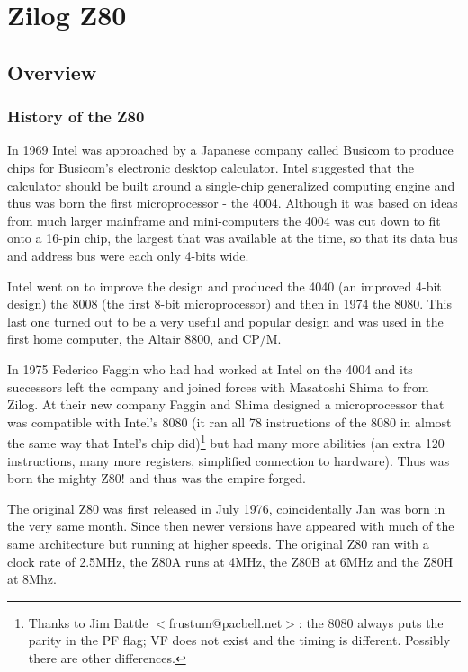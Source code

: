 \documentclass[12pt,twoside,openright,a4paper]{book}
\begin{document}
\chapter{Zilog Z80}

\minitoc

\pagebreak
\section{Overview}
\subsection{History of the Z80}

In 1969 Intel was approached by a Japanese company called Busicom to produce  chips for Busicom's electronic desktop calculator. Intel suggested that the calculator should be built around a single-chip generalized computing engine and thus was born the first microprocessor - the 4004. Although it was based on ideas from much larger mainframe and mini-computers the 4004 was cut down to fit onto a 16-pin chip, the largest that was available at the time, so that its data bus and address bus were each only 4-bits wide. 

Intel went on to improve the design and produced the 4040 (an improved 4-bit design) the 8008 (the first 8-bit microprocessor) and then in 1974 the 8080. This last one turned out to be a very useful and popular design and was used in the first home computer, the Altair 8800, and CP/M. 

In 1975 Federico Faggin who had had worked at Intel on the 4004 and its successors left the company and joined forces with Masatoshi Shima to from Zilog. At their new company Faggin and Shima designed a microprocessor that was compatible with Intel's 8080 (it ran all 78 instructions of the 8080 in almost the same way that Intel's chip did)\footnote{Thanks to Jim Battle $<$frustum@pacbell.net$>$: the 8080 always puts the parity in the PF flag; VF does not exist and the timing is different. Possibly there are other differences.} but had many more abilities (an extra 120 instructions, many more registers, simplified connection to hardware). Thus was born the mighty Z80! and thus was the empire forged.

The original Z80 was first released in July 1976, coincidentally Jan was born in the very same month. Since then newer versions have appeared with much of the same architecture but running at higher speeds. The original Z80 ran with a clock rate of 2.5MHz, the Z80A runs at 4MHz, the Z80B at 6MHz and the Z80H at 8Mhz. 
\end{document}
